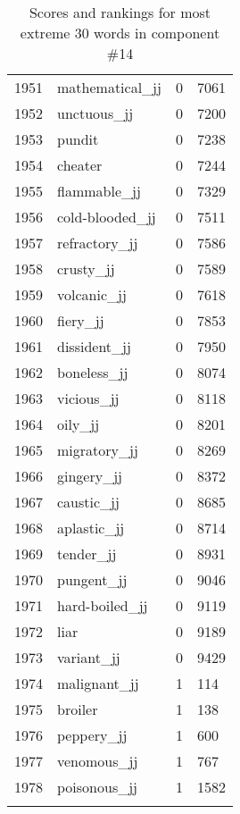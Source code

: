 \begin{longtable}[!htbp]{| rlr@{.}l |}
    1951 & mathematical\_jj & 0 & 7061 \\
    1952 & unctuous\_jj & 0 & 7200 \\
    1953 & pundit & 0 & 7238 \\
    1954 & cheater & 0 & 7244 \\
    1955 & flammable\_jj & 0 & 7329 \\
    1956 & cold-blooded\_jj & 0 & 7511 \\
    1957 & refractory\_jj & 0 & 7586 \\
    1958 & crusty\_jj & 0 & 7589 \\
    1959 & volcanic\_jj & 0 & 7618 \\
    1960 & fiery\_jj & 0 & 7853 \\
    1961 & dissident\_jj & 0 & 7950 \\
    1962 & boneless\_jj & 0 & 8074 \\
    1963 & vicious\_jj & 0 & 8118 \\
    1964 & oily\_jj & 0 & 8201 \\
    1965 & migratory\_jj & 0 & 8269 \\
    1966 & gingery\_jj & 0 & 8372 \\
    1967 & caustic\_jj & 0 & 8685 \\
    1968 & aplastic\_jj & 0 & 8714 \\
    1969 & tender\_jj & 0 & 8931 \\
    1970 & pungent\_jj & 0 & 9046 \\
    1971 & hard-boiled\_jj & 0 & 9119 \\
    1972 & liar & 0 & 9189 \\
    1973 & variant\_jj & 0 & 9429 \\
    1974 & malignant\_jj & 1 & 114 \\
    1975 & broiler & 1 & 138 \\
    1976 & peppery\_jj & 1 & 600 \\
    1977 & venomous\_jj & 1 & 767 \\
    1978 & poisonous\_jj & 1 & 1582 \\
    \hline
    \caption{Scores and rankings for most extreme 30 words in component \#14} \\
\end{longtable}
